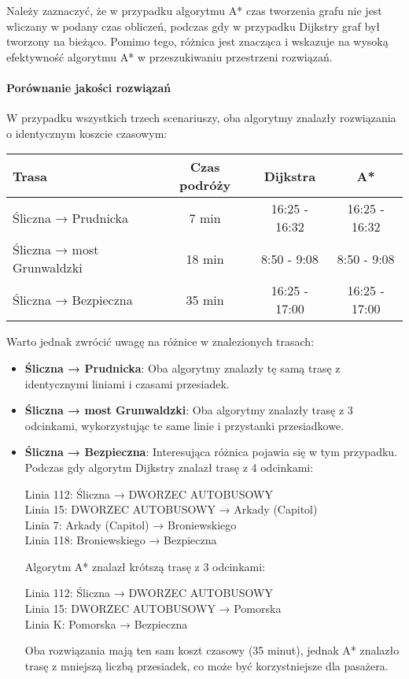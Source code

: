 \documentclass[12pt,a4paper]{article}
\begin{document}
Należy zaznaczyć, że w przypadku algorytmu A* czas tworzenia grafu nie jest wliczany w podany czas obliczeń, podczas gdy w przypadku Dijkstry graf był tworzony na bieżąco. Pomimo tego, różnica jest znacząca i wskazuje na wysoką efektywność algorytmu A* w przeszukiwaniu przestrzeni rozwiązań.

\paragraph{Porównanie jakości rozwiązań}
W przypadku wszystkich trzech scenariuszy, oba algorytmy znalazły rozwiązania o identycznym koszcie czasowym:

\begin{center}
\begin{tabular}{|l|c|c|c|}
\hline
\textbf{Trasa} & \textbf{Czas podróży} & \textbf{Dijkstra} & \textbf{A*} \\
\hline
Śliczna → Prudnicka & 7 min & 16:25 - 16:32 & 16:25 - 16:32 \\
Śliczna → most Grunwaldzki & 18 min & 8:50 - 9:08 & 8:50 - 9:08 \\
Śliczna → Bezpieczna & 35 min & 16:25 - 17:00 & 16:25 - 17:00 \\
\hline
\end{tabular}
\end{center}

Warto jednak zwrócić uwagę na różnice w znalezionych trasach:

\begin{itemize}
    \item \textbf{Śliczna → Prudnicka}: Oba algorytmy znalazły tę samą trasę z identycznymi liniami i czasami przesiadek.
    
    \item \textbf{Śliczna → most Grunwaldzki}: Oba algorytmy znalazły trasę z 3 odcinkami, wykorzystując te same linie i przystanki przesiadkowe.
    
    \item \textbf{Śliczna → Bezpieczna}: Interesująca różnica pojawia się w tym przypadku. Podczas gdy algorytm Dijkstry znalazł trasę z 4 odcinkami:
    \begin{center}
    Linia 112: Śliczna → DWORZEC AUTOBUSOWY \\
    Linia 15: DWORZEC AUTOBUSOWY → Arkady (Capitol) \\
    Linia 7: Arkady (Capitol) → Broniewskiego \\
    Linia 118: Broniewskiego → Bezpieczna
    \end{center}
    
    Algorytm A* znalazł krótszą trasę z 3 odcinkami:
    \begin{center}
    Linia 112: Śliczna → DWORZEC AUTOBUSOWY \\
    Linia 15: DWORZEC AUTOBUSOWY → Pomorska \\
    Linia K: Pomorska → Bezpieczna
    \end{center}
    
    Oba rozwiązania mają ten sam koszt czasowy (35 minut), jednak A* znalazło trasę z mniejszą liczbą przesiadek, co może być korzystniejsze dla pasażera.
\end{itemize}
\end{document}
